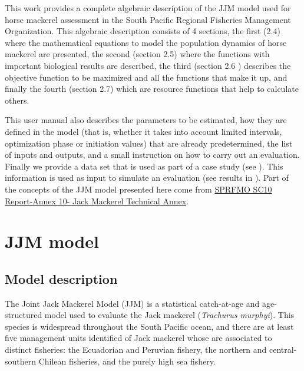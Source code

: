 \documentclass{article}
\begin{document}
This work provides a complete algebraic description of the JJM model used for horse mackerel assessment in the South Pacific Regional Fisheries Management Organization. This algebraic description consists of 4 sections, the first (2.4) where the mathematical equations to model the population dynamics of horse mackerel are presented, the second (section 2.5) where the functions with important biological results are described, the third (section 2.6 ) describes the objective function to be maximized and all the functions that make it up, and finally the fourth (section 2.7) which are resource functions that help to calculate others.


This user manual also describes the parameters to be estimated, how they are defined in the model (that is, whether it takes into account limited intervals, optimization phase or initiation values) that are already predetermined, the list of inputs and outputs, and a small instruction on how to carry out an evaluation.
Finally we provide a data set that is used as part of a case study (see ). This information is used as input to simulate an evaluation (see results in ).
Part of the concepts of the JJM model presented here come from \href{https://www.sprfmo.int/assets/Meetings/SC/10th-SC-2022/Report-and-Annexes/Annex-8-JM-Technical-Advice-CV_2.pdf}{SPRFMO SC10 Report-Annex 10- Jack Mackerel Technical Annex}.

\section{JJM model}

\subsection{Model description}

The Joint Jack Mackerel Model (JJM) is a statistical catch-at-age and age-structured model used to evaluate the Jack mackerel (\textit{Trachurus murphyi}). This species is widespread throughout the South Pacific ocean, and there are at least five management units identified of Jack mackerel whose are associated to distinct fisheries: the Ecuadorian and Peruvian fishery, the northern and central-southern Chilean fisheries, and the purely high sea fishery. 
\end{document}
